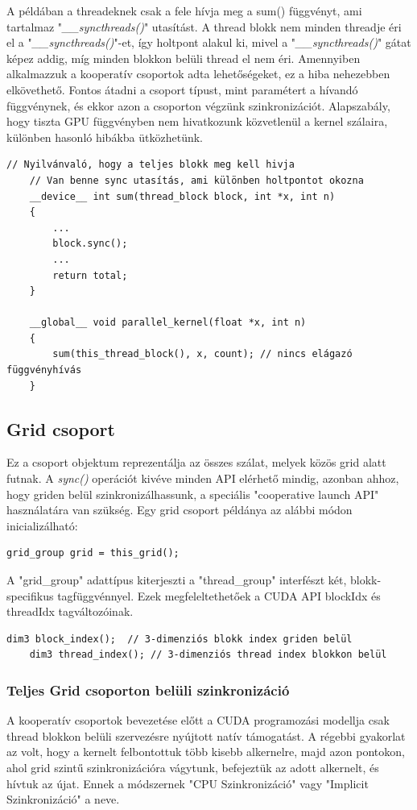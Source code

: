 A példában a threadeknek csak a fele hívja meg a sum() függvényt, ami tartalmaz "\textit{\_\_syncthreads()}" utasítást. A thread blokk nem minden threadje éri el a "\textit{\_\_syncthreads()}"-et, így holtpont alakul ki, mivel a "\textit{\_\_syncthreads()}" gátat képez addig, míg minden blokkon belüli thread el nem éri.
Amennyiben alkalmazzuk a kooperatív csoportok adta lehetőségeket, ez a hiba nehezebben elkövethető. Fontos átadni a csoport típust, mint paramétert a hívandó függvénynek, és ekkor azon a csoporton végzünk szinkronizációt. Alapszabály, hogy tiszta GPU függvényben nem hivatkozunk közvetlenül  a kernel szálaira, különben hasonló hibákba ütközhetünk.
\begin{lstlisting}[style=CStyle]
	// Nyilvánvaló, hogy a teljes blokk meg kell hivja
	// Van benne sync utasítás, ami különben holtpontot okozna
	__device__ int sum(thread_block block, int *x, int n) 
	{
		...
		block.sync();
		...
		return total;
	}
	
	__global__ void parallel_kernel(float *x, int n)
	{
		sum(this_thread_block(), x, count); // nincs elágazó függvényhívás
	}
\end{lstlisting}


\subsection{Grid csoport}
Ez a csoport objektum reprezentálja az összes szálat, melyek közös grid alatt futnak. A \textit{sync()} operációt kivéve minden API elérhető mindig, azonban ahhoz, hogy griden belül szinkronizálhassunk, a speciális "cooperative launch API" használatára van szükség.
Egy grid csoport példánya az alábbi módon inicializálható:
\begin{lstlisting}[style=CStyle]
	grid_group grid = this_grid();
\end{lstlisting}
A "grid\_group" adattípus kiterjeszti a "thread\_group" interfészt két, blokk-specifikus tagfüggvénnyel. Ezek megfeleltethetőek a CUDA API blockIdx és threadIdx tagváltozóinak.
\begin{lstlisting}[style=CStyle]
	dim3 block_index();  // 3-dimenziós blokk index griden belül
	dim3 thread_index(); // 3-dimenziós thread index blokkon belül
\end{lstlisting}

\subsubsection{Teljes Grid csoporton belüli szinkronizáció}
\label{subsubsec:Grid}
A kooperatív csoportok bevezetése előtt a CUDA programozási modellja csak thread blokkon belüli szervezésre nyújtott natív támogatást. A régebbi gyakorlat az volt, hogy a kernelt felbontottuk több kisebb alkernelre, majd azon pontokon, ahol grid szintű szinkronizációra vágytunk, befejeztük az adott alkernelt, és hívtuk az újat. Ennek a módszernek "CPU Szinkronizáció" vagy "Implicit Szinkronizáció" a neve. 

